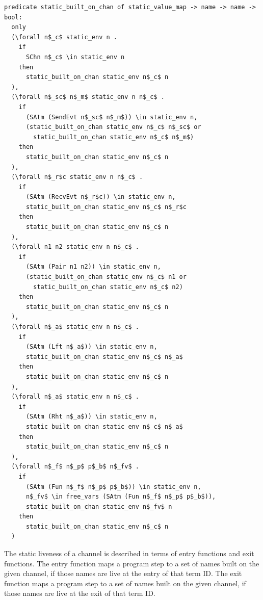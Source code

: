 \documentclass[10pt]{article}
\begin{document}
\begin{lstlisting}[language=logic, mathescape]
  predicate static_built_on_chan of static_value_map -> name -> name -> bool:
  only
  (\forall n$_c$ static_env n .
    if 
      SChn n$_c$ \in static_env n 
    then 
      static_built_on_chan static_env n$_c$ n
  ),
  (\forall n$_sc$ n$_m$ static_env n n$_c$ . 
    if
      (SAtm (SendEvt n$_sc$ n$_m$)) \in static_env n,
      (static_built_on_chan static_env n$_c$ n$_sc$ or
        static_built_on_chan static_env n$_c$ n$_m$)
    then 
      static_built_on_chan static_env n$_c$ n
  ),
  (\forall n$_r$c static_env n n$_c$ . 
    if  
      (SAtm (RecvEvt n$_r$c)) \in static_env n,
      static_built_on_chan static_env n$_c$ n$_r$c
    then 
      static_built_on_chan static_env n$_c$ n
  ),
  (\forall n1 n2 static_env n n$_c$ . 
    if  
      (SAtm (Pair n1 n2)) \in static_env n,
      (static_built_on_chan static_env n$_c$ n1 or
        static_built_on_chan static_env n$_c$ n2)
    then 
      static_built_on_chan static_env n$_c$ n
  ),
  (\forall n$_a$ static_env n n$_c$ .
    if
      (SAtm (Lft n$_a$)) \in static_env n,
      static_built_on_chan static_env n$_c$ n$_a$
    then 
      static_built_on_chan static_env n$_c$ n
  ),
  (\forall n$_a$ static_env n n$_c$ .
    if
      (SAtm (Rht n$_a$)) \in static_env n,
      static_built_on_chan static_env n$_c$ n$_a$
    then 
      static_built_on_chan static_env n$_c$ n
  ),
  (\forall n$_f$ n$_p$ p$_b$ n$_fv$ .
    if
      (SAtm (Fun n$_f$ n$_p$ p$_b$)) \in static_env n,
      n$_fv$ \in free_vars (SAtm (Fun n$_f$ n$_p$ p$_b$)),
      static_built_on_chan static_env n$_fv$ n
    then
      static_built_on_chan static_env n$_c$ n
  )
\end{lstlisting}


The static liveness of a channel is described in terms of entry functions and
exit functions. The entry function maps a program step to a set of names built on
the given channel, if those names are live at the entry of that term ID.
The exit function maps a program step to a
set of names built on the given channel, if those names are live at the exit of that
term ID.
\end{document}

